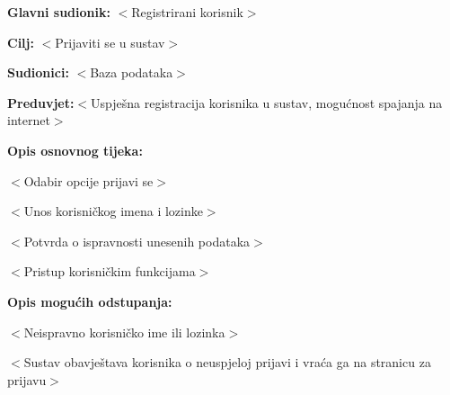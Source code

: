 	\noindent {}
	\begin{packed_item}
		
		\item \textbf{Glavni sudionik: }$<$Registrirani korisnik$>$
		\item  \textbf{Cilj:} $<$Prijaviti se u sustav$>$
		\item  \textbf{Sudionici:} $<$Baza podataka$>$
		\item  \textbf{Preduvjet:}$<$Uspješna registracija korisnika u sustav, mogućnost spajanja na internet$>$
		\item  \textbf{Opis osnovnog tijeka:}
		
		\item[] \begin{packed_enum}
			
			\item $<$Odabir opcije prijavi se$>$
			\item $<$Unos korisničkog imena i lozinke$>$
			\item $<$Potvrda o ispravnosti unesenih podataka$>$
			\item $<$Pristup korisničkim funkcijama$>$
		\end{packed_enum}
		
		\item  \textbf{Opis mogućih odstupanja:}
		
		\item[] \begin{packed_item}
			
			\item[2.a] $<$Neispravno korisničko ime ili lozinka$>$
			\item[] \begin{packed_enum}
				
				\item $<$Sustav obavještava korisnika o neuspjeloj prijavi i vraća ga na stranicu za prijavu$>$
				
			\end{packed_enum}
			
		\end{packed_item}
	\end{packed_item}

